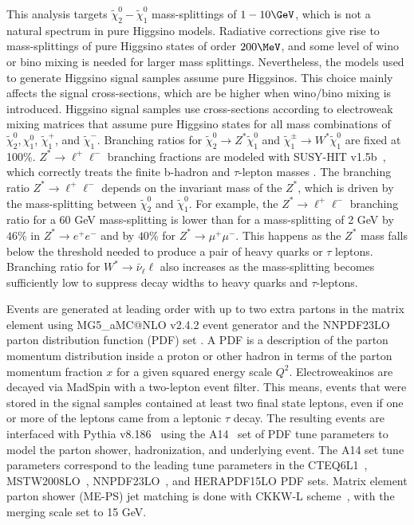 This analysis targets $\tilde\chi_2^0-\tilde\chi_1^0$ mass-splittings of $1-10\GeV$, which is not a natural spectrum in pure Higgsino models.  Radiative corrections give rise to mass-splittings of pure Higgsino states of order $200\MeV$, and some level of wino or bino mixing is needed for larger mass splittings.  Nevertheless, the models used to generate Higgsino signal samples assume pure Higgsinos.  This choice mainly affects the signal cross-sections, which are be higher when wino/bino mixing is introduced.  Higgsino signal samples use cross-sections according to electroweak mixing matrices that assume pure Higgsino states for all mass combinations of $\tilde\chi_2^0, \chi_1^0$, $\tilde\chi_1^+$, and $\tilde\chi_1^-$.  Branching ratios for $\tilde\chi_2^0 \rightarrow Z^*\tilde\chi_1^0$ and $\tilde\chi_1^\pm \rightarrow W^* \tilde\chi_1^0$ are fixed at 100\%.  $Z^*\rightarrow \ell^+\ell^-$ branching fractions are modeled with SUSY-HIT v1.5b~\cite{spira}, which correctly treats the finite b-hadron and $\tau$-lepton masses \cite{spira}.  
The branching ratio $Z^* \rightarrow \ell^+\ell^-$ depends on the invariant mass of the $Z^*$, which is driven by the mass-splitting between $\tilde\chi^0_2$ and $\tilde\chi^0_1$.  For example, the $Z^* \rightarrow \ell^+\ell^-$ branching ratio for a 60 GeV mass-splitting is lower than for a mass-splitting of 2 GeV by  $46\%$ in $Z^* \rightarrow e^+e^-$ and by $40\%$ for $Z^* \rightarrow \mu^+\mu^-$.  This happens as the $Z^*$ mass falls below the threshold needed to produce a pair of heavy quarks or $\tau$ leptons.  Branching ratio for $W^* \rightarrow \bar{\nu}_\ell \ell$ also increases as the mass-splitting becomes sufficiently low to suppress decay widths to heavy quarks and $\tau$-leptons. %

Events are generated at leading order with up to two extra partons in the matrix element using MG5\_aMC@NLO v2.4.2 event generator \cite{alwall} and the NNPDF23LO parton distribution function (PDF) set \cite{ball}.   A PDF is a description of the parton momentum distribution inside a proton or other hadron in terms of the parton momentum fraction $x$ for a given squared energy scale $Q^2$.   Electroweakinos are decayed via MadSpin \cite{1126-6708-2007-04-081, Artoisenet2013} with a two-lepton event filter.  This means, events that were stored in the signal samples contained at least two final state leptons, even if one or more of the leptons came from a leptonic $\tau$ decay.  The resulting events are interfaced with Pythia v8.186~\cite{pythia} using the A14~\cite{a14} set of PDF tune parameters to model the parton shower, hadronization, and underlying event.  The A14 set tune parameters correspond to the leading tune parameters in the CTEQ6L1~\cite{Pumplin:2002vw}, MSTW2008LO~\cite{Watt:2012tq}, NNPDF23LO~\cite{ball}, and HERAPDF15LO PDF sets.  Matrix element parton shower (ME-PS) jet matching is done with CKKW-L scheme~\cite{ckkwl}, with the merging scale set to 15 GeV.  

